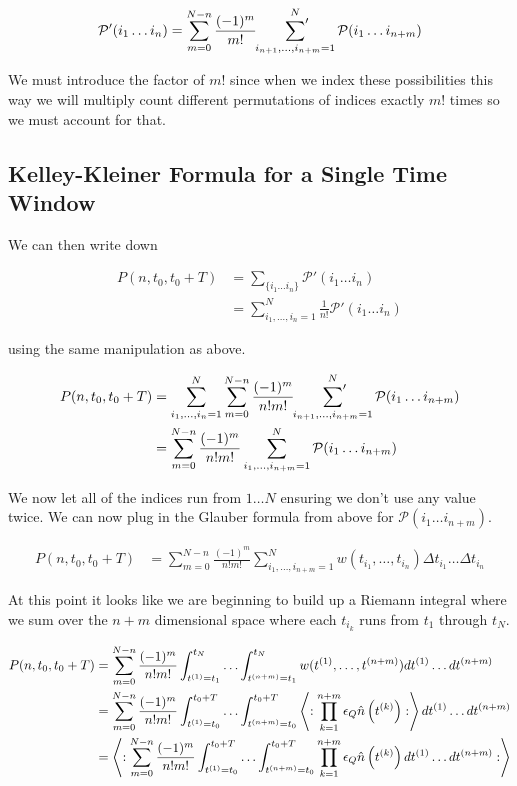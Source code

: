\documentclass[12pt]{article}
\begin{document}
\begin{align}
\mathcal{P}'(i_1 \ldots i_n) = \sum_{m=0}^{N-n} \frac{(-1)^m}{m!} \sideset{}{'}\sum_{i_{n+1}, \ldots ,i_{n+m} = 1}^N \mathcal{P}(i_1 \ldots i_{n+m})
\end{align}

We must introduce the factor of $m!$ since when we index these possibilities this way we will multiply count different permutations of indices exactly $m!$ times so we must account for that.

\subsection{Kelley-Kleiner Formula for a Single Time Window}

We can then write down

\begin{align}
P(n,t_0,t_0+T) &= \sum_{\{i_1 \ldots i_n\}} \mathcal{P}'(i_1 \ldots i_n)\\
&= \sum_{i_1, \ldots, i_n = 1}^N \frac{1}{n!} \mathcal{P}'(i_1 \ldots i_n)
\end{align}

using the same manipulation as above.

\begin{align}
P(n,t_0,t_0+T) &=\sum_{i_1, \ldots ,i_n=1}^N \sum_{m=0}^{N-n} \frac{(-1)^m}{n!m!} \sideset{}{'}\sum_{i_{n+1}, \ldots ,i_{n+m}=1}^N \mathcal{P}(i_1 \ldots i_{n+m})\\
&= \sum_{m=0}^{N-n} \frac{(-1)^m}{n! m!} \sum_{i_1, \ldots ,i_{n+m}=1}^N \mathcal{P}(i_1 \ldots i_{n+m})
\end{align}

We now let all of the indices run from $1 \ldots N$ ensuring we don't use any value twice. We can now plug in the Glauber formula from above for $\mathcal{P}(i_1 \ldots i_{n+m})$.

\begin{align}
P(n,t_0,t_0+T) &= \sum_{m=0}^{N-n} \frac{(-1)^m}{n! m!} \sum_{i_1, \ldots ,i_{n+m}=1}^N w(t_{i_1},\ldots ,t_{i_{n}}) \Delta t_{i_1} \ldots \Delta t_{i_n}
\end{align}

At this point it looks like we are beginning to build up a Riemann integral where we sum over the $n+m$ dimensional space where each $t_{i_k}$ runs from $t_1$ through $t_N$.

\begin{align}
P(n,t_0,t_0+T) &= \sum_{m=0}^{N-n}\frac{(-1)^m}{n! m!} \int_{t^{(1)}=t_1}^{t_N} \ldots \int_{t^{(n+m)}=t_1}^{t_N} w(t^{(1)},\ldots ,t^{(n+m)}) dt^{(1)} \ldots dt^{(n+m)}\\
&= \sum_{m=0}^{N-n}\frac{(-1)^m}{n! m!} \int_{t^{(1)}=t_0}^{t_0+T} \ldots \int_{t^{(n+m)}=t_0}^{t_0+T} \Braket{:\prod_{k=1}^{n+m} \epsilon_Q \hat{n}\left(t^{(k)}\right) :} dt^{(1)} \ldots dt^{(n+m)}\\
&= \Braket{: \sum_{m=0}^{N-n}\frac{(-1)^m}{n! m!} \int_{t^{(1)}=t_0}^{t_0+T} \ldots \int_{t^{(n+m)}=t_0}^{t_0+T} \prod_{k=1}^{n+m} \epsilon_Q \hat{n}\left(t^{(k)}\right) dt^{(1)} \ldots dt^{(n+m)}:}
\end{align}
\end{document}
